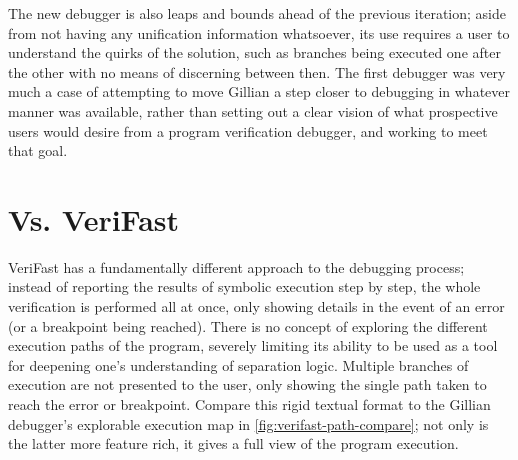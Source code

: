 The new debugger is also leaps and bounds ahead of the previous iteration;
aside from not having any unification information whatsoever, its use requires
a user to understand the quirks of the solution, such as branches being executed
one after the other with no means of discerning between then. The first debugger
was very much a case of attempting to move Gillian a step closer to debugging in
whatever manner was available, rather than setting out a clear vision of what
prospective users would desire from a program verification debugger, and working
to meet that goal.


\section{Vs. VeriFast}

VeriFast has a fundamentally different approach to the debugging process;
instead of reporting the results of symbolic execution step by step, the whole
verification is performed all at once, only showing details in the event of an
error (or a breakpoint being reached). There is no concept of exploring the
different execution paths of the program, severely limiting its ability to be
used as a tool for deepening one's understanding of separation logic. Multiple
branches of execution are not presented to the user, only showing the single
path taken to reach the error or breakpoint. Compare this rigid textual format
to the Gillian debugger's explorable execution map in
\autoref{fig:verifast-path-compare}; not only is the latter more feature rich,
it gives a full view of the program execution.

